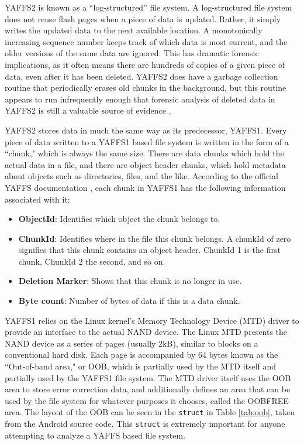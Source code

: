 YAFFS2 is known as a ``log-structured'' file system.  A log-structured file system does not reuse flash pages when a piece of data is
updated.  Rather, it simply writes the updated data to the next available location.  A monotonically increasing sequence number
keeps track of which data is most current, and the older versions of the same data are ignored.  This has dramatic forensic
implications, as it often means there are hundreds of copies of a given piece of data, even after it has been deleted.  YAFFS2 does
have a garbage collection routine that periodically erases old chunks in the background, but this routine appears to run
infrequently enough that forensic analysis of deleted data in YAFFS2 is still a valuable source of evidence \cite{naval}. 

YAFFS2 stores data in much the same way as its predecessor, YAFFS1.  Every piece of data written to a YAFFS1 based file system is
written in the form of a ``chunk," which is always the same size.  There are data chunks which hold the actual data in a file, and
there are object header chunks, which hold metadata about objects such as directories, files, and the like.  According to the
official YAFFS documentation \cite{howyaffsworks}, each chunk in YAFFS1
has the following information associated with it:

\begin{itemize}
	\item {\bf ObjectId}: Identifies which object the chunk belongs to.\
	\item {\bf ChunkId}: Identifies where in the file this chunk belongs. 
		A chunkId of zero signifies that this chunk contains an object header. 
		ChunkId 1 is the first chunk, ChunkId 2 the second, and so on.
	\item {\bf Deletion Marker}: Shows that this chunk is no longer in use.
	\item {\bf Byte count}: Number of bytes of data if this is a data chunk.
\end{itemize}

YAFFS1 relies on the Linux kernel's Memory Technology Device (MTD) driver to provide an interface to the actual NAND device.  The
Linux MTD presents the NAND device as a series of pages (usually 2kB), similar to blocks on a conventional hard disk.  Each page is
accompanied by 64 bytes known as the ``Out-of-band area," or OOB, which is partially used by the MTD itself and partially used by
the YAFFS1 file system. The MTD driver itself uses the OOB area to store error correction data, and additionally defines an area that
can be used by the file system for whatever purposes it chooses, called the OOBFREE area.  The layout of the OOB can be seen in the
\texttt{struct} in Table \ref{tab:oob}, taken from the Android source code. This \texttt{struct} is extremely important for anyone
attempting to analyze a YAFFS based file system.

